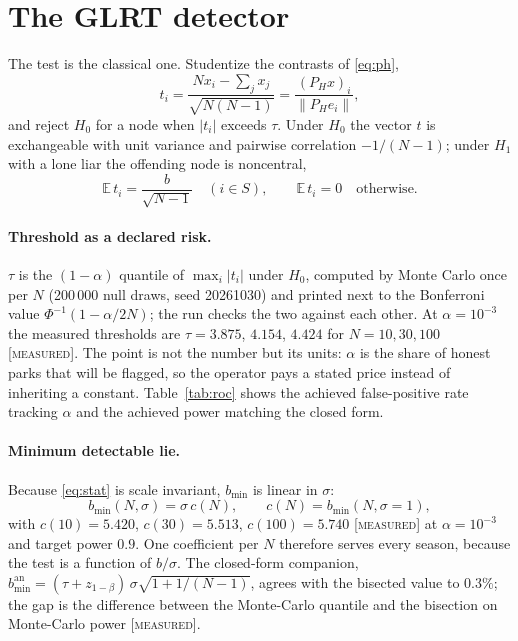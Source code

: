 \documentclass[10pt,twocolumn,a4paper]{article}
\newcommand{\measured}{\textcolor{blue!70!black}{\textsc{[measured]}}}
\theoremstyle{definition}
\theoremstyle{remark}
\newcommand{\PH}{P_{H}}
\newcommand{\bmin}{b_{\min}}
\newcommand{\taur}{\tau}
\begin{document}
\section{The GLRT detector}
\label{sec:glrt}

The test is the classical one. Studentize the contrasts of \eqref{eq:ph},
\begin{equation}
t_i=\frac{N x_i-\sum_j x_j}{\sqrt{N(N-1)}}=\frac{(\PH x)_i}{\|\PH e_i\|},
\label{eq:stat}
\end{equation}
and reject $H_0$ for a node when $|t_i|$ exceeds $\taur$. Under $H_0$ the vector
$t$ is exchangeable with unit variance and pairwise correlation $-1/(N-1)$; under
$H_1$ with a lone liar the offending node is noncentral,
\begin{equation}
\mathbb E\,t_i=\frac{b}{\sqrt{N-1}}\quad (i\in S),\qquad
\mathbb E\,t_i=0\quad\text{otherwise.}
\label{eq:tmean1}
\end{equation}

\paragraph{Threshold as a declared risk.} $\taur$ is the $(1-\alpha)$ quantile of
$\max_i|t_i|$ under $H_0$, computed by Monte Carlo once per $N$
(200\,000 null draws, seed 20261030) and printed next to the Bonferroni value
$\Phi^{-1}(1-\alpha/2N)$; the run checks the two against each other. At
$\alpha=10^{-3}$ the measured thresholds are $\taur=3.875$, $4.154$, $4.424$ for
$N=10,30,100$ \measured. The point is not the number but its units: $\alpha$ is
the share of honest parks that will be flagged, so the operator pays a stated
price instead of inheriting a constant. Table~\ref{tab:roc} shows the achieved
false-positive rate tracking $\alpha$ and the achieved power matching the closed
form.

\paragraph{Minimum detectable lie.} Because \eqref{eq:stat} is scale invariant,
$\bmin$ is linear in $\sigma$:
\begin{equation}
\bmin(N,\sigma)=\sigma\,c(N),\qquad c(N)=\bmin(N,\sigma=1),
\label{eq:bmin}
\end{equation}
with $c(10)=5.420$, $c(30)=5.513$, $c(100)=5.740$ \measured{} at $\alpha=10^{-3}$
and target power $0.9$. One coefficient per $N$ therefore serves every season,
because the test is a function of $b/\sigma$. The closed-form companion,
$\bmin^{\mathrm{an}}=({\taur}+z_{1-\beta})\,\sigma\sqrt{1+1/(N-1)}$, agrees with
the bisected value to $0.3\%$; the gap is the difference between the Monte-Carlo
quantile and the bisection on Monte-Carlo power \measured.
\end{document}
